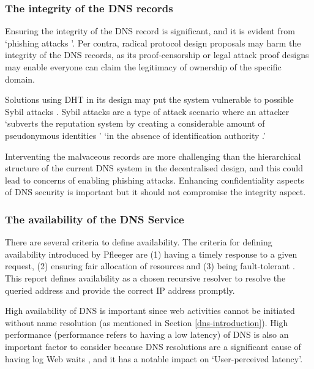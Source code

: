 \subsubsection{The integrity of the DNS records}
Ensuring the integrity of the DNS record is significant, and it is evident from `phishing attacks \cite{ariyapperuma2007security, ollmann2004phishing}'.
Per contra, radical protocol design proposals may harm the integrity of the DNS records, as its proof-censorship or legal attack proof designs may enable everyone can claim the legitimacy of ownership of the specific domain.

Solutions using DHT in its design may put the system vulnerable to possible Sybil attacks \cite{6503215, SitE2002Scfp}.
Sybil attacks are a type of attack scenario where an attacker `subverts the reputation system by creating a considerable amount of pseudonymous identities \cite{TRIFA20141135}' `in the absence of identification authority \cite{douceur2002sybil}.'

Interventing the malvaceous records are more challenging than the hierarchical structure of the current DNS system in the decentralised design, and this could lead to concerns of enabling phishing attacks.
Enhancing confidentiality aspects of DNS security is important but it should not compromise the integrity aspect.

\subsubsection{The availability of the DNS Service}
There are several criteria to define availability. The criteria for defining availability introduced by Pfleeger are (1) having a timely response to a given request, (2) ensuring fair allocation of resources and (3) being fault-tolerant \cite{securityincomputing}.
This report defines availability as a chosen recursive resolver to resolve the queried address and provide the correct IP address promptly.

High availability of DNS is important since web activities cannot be initiated without name resolution (as mentioned in Section \ref{dns-introduction}). High performance (performance refers to having a low latency) of DNS is also an important factor to consider because DNS resolutions are a significant cause of having log Web waits \cite{cohen2003proactive, jung2002dns}, and it has a notable impact on `User-perceived latency'.
